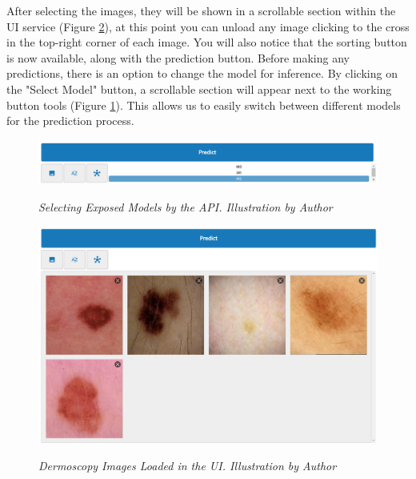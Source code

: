 After selecting the images, they will be shown in a scrollable section within
the UI service (Figure \ref{fig:loaded-images}), at this point you can
unload any image clicking to the cross in the top-right corner of each image.
You will also notice that the sorting button is now available, along with the
prediction button. Before making any predictions, there is an option to change
the model for inference. By clicking on the "Select Model" button, a scrollable
section will appear next to the working button tools (Figure
\ref{fig:selecting-model}). This allows us to easily switch between different
models for the prediction process.

\begin{figure}[H]
  \centering
  \includegraphics[width=\textwidth]{imatges/results/selecting-model.png}
  \caption[Selecting Exposed Models by the API]{\textit{Selecting Exposed Models by the API. Illustration by Author}}
  {\label{fig:selecting-model}}
\end{figure}


\begin{figure}[H]
  \centering
  \begin{adjustbox}{width=\textwidth, trim={0cm 3.5cm 0cm 0cm}, clip}
    \includegraphics[width=\textwidth]{imatges/results/loaded-images.png}
  \end{adjustbox}
  \caption[Dermoscopy Images Loaded in the UI]{\textit{Dermoscopy Images Loaded in the UI. Illustration by Author}}
  {\label{fig:loaded-images}}
\end{figure}

